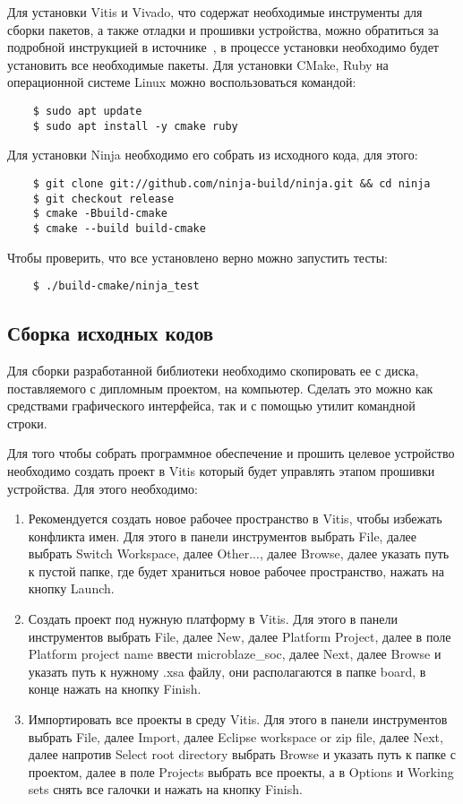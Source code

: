 Для установки Vitis и Vivado, что содержат необходимые инструменты для сборки пакетов, а также отладки и прошивки устройства, можно
обратиться за подробной инструкцией в источнике~\cite{instal_vivado}, в процессе установки необходимо будет установить
все необходимые пакеты. Для установки CMake, Ruby на операционной системе Linux можно воспользоваться командой:
\begin{lstlisting}
    $ sudo apt update
    $ sudo apt install -y cmake ruby
\end{lstlisting}

Для установки Ninja необходимо его собрать из исходного кода, для этого:
\begin{lstlisting}
    $ git clone git://github.com/ninja-build/ninja.git && cd ninja
    $ git checkout release
    $ cmake -Bbuild-cmake
    $ cmake --build build-cmake
\end{lstlisting}

Чтобы проверить, что все установлено верно можно запустить тесты: 
\begin{lstlisting}
    $ ./build-cmake/ninja_test
\end{lstlisting}

\subsection{Сборка исходных кодов}

Для сборки разработанной библиотеки необходимо скопировать ее с диска, поставляемого
с дипломным проектом, на компьютер. Сделать это можно как средствами
графического интерфейса, так и с помощью утилит командной строки.

Для того чтобы собрать программное обеспечение и прошить целевое устройство необходимо создать проект в Vitis который будет управлять этапом прошивки устройства. Для
этого необходимо:

\begin{enumerate}
    \item Рекомендуется создать новое рабочее пространство в Vitis, чтобы избежать конфликта имен. 
    Для этого в панели инструментов выбрать File, далее выбрать Switch Workspace, далее Other..., 
    далее Browse, далее указать путь к пустой папке, где будет храниться новое рабочее пространство, нажать на кнопку Launch.
    \item Создать проект под нужную платформу в Vitis. Для этого в панели инструментов выбрать File, далее New, далее Platform Project, далее в 
    поле Platform project name ввести microblaze\_soc, далее Next, далее Browse и указать путь к нужному .xsa файлу, 
    они располагаются в папке board, в конце нажать на кнопку Finish.
    \item Импортировать все проекты в среду Vitis. Для этого в панели инструментов выбрать File, далее Import, далее Eclipse workspace or zip file, далее Next, далее
    напротив Select root directory выбрать Browse и указать путь к  папке с проектом, далее в поле Projects выбрать все проекты, а в Options 
    и Working sets снять все галочки и нажать на кнопку Finish.
\end{enumerate}

